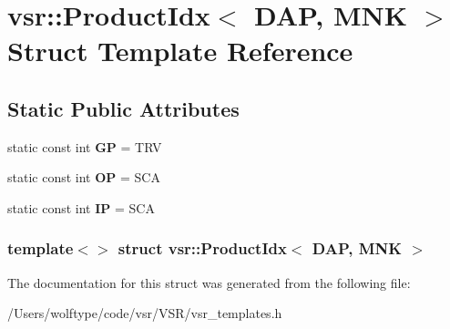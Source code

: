 \hypertarget{structvsr_1_1_product_idx_3_01_d_a_p_00_01_m_n_k_01_4}{\section{vsr\-:\-:Product\-Idx$<$ D\-A\-P, M\-N\-K $>$ Struct Template Reference}
\label{structvsr_1_1_product_idx_3_01_d_a_p_00_01_m_n_k_01_4}
}
\subsection*{Static Public Attributes}
\begin{DoxyCompactItemize}
\item 
\hypertarget{structvsr_1_1_product_idx_3_01_d_a_p_00_01_m_n_k_01_4_a791e68a70a3659bc8aa0a22bbf03b0ac}{static const int {\bfseries G\-P} = T\-R\-V}\label{structvsr_1_1_product_idx_3_01_d_a_p_00_01_m_n_k_01_4_a791e68a70a3659bc8aa0a22bbf03b0ac}

\item 
\hypertarget{structvsr_1_1_product_idx_3_01_d_a_p_00_01_m_n_k_01_4_a6972b0644e94834dca749c0e02dfc5b5}{static const int {\bfseries O\-P} = S\-C\-A}\label{structvsr_1_1_product_idx_3_01_d_a_p_00_01_m_n_k_01_4_a6972b0644e94834dca749c0e02dfc5b5}

\item 
\hypertarget{structvsr_1_1_product_idx_3_01_d_a_p_00_01_m_n_k_01_4_a6cfe14c70071c772c5314993900ce6f5}{static const int {\bfseries I\-P} = S\-C\-A}\label{structvsr_1_1_product_idx_3_01_d_a_p_00_01_m_n_k_01_4_a6cfe14c70071c772c5314993900ce6f5}

\end{DoxyCompactItemize}
\subsubsection*{template$<$$>$ struct vsr\-::\-Product\-Idx$<$ D\-A\-P, M\-N\-K $>$}



The documentation for this struct was generated from the following file\-:\begin{DoxyCompactItemize}
\item 
/\-Users/wolftype/code/vsr/\-V\-S\-R/vsr\-\_\-templates.\-h\end{DoxyCompactItemize}
